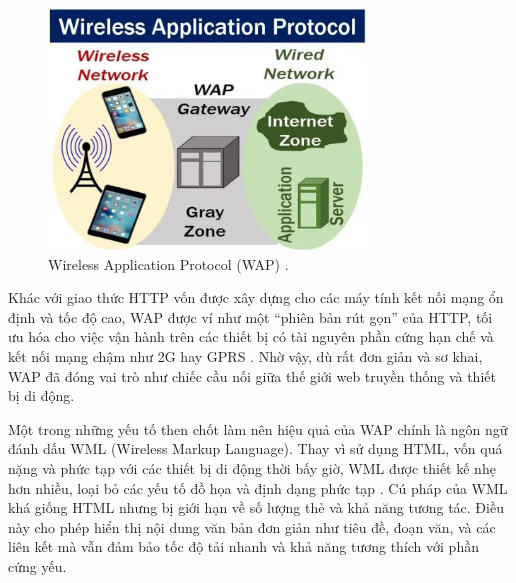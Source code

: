 \begin{figure}[H]
  \centering
  \includegraphics[width=0.75\textwidth]{images/Wireless-Application-Protocol-WAP-la-gi.jpg}
  \caption{Wireless Application Protocol (WAP) \cite{bkhostWAP}.}
  \label{fig:fig7}
\end{figure}
  
  \begin{flushleft}
  \hspace*{0.8cm}Khác với giao thức HTTP vốn được xây dựng cho các máy tính kết nối mạng ổn định và tốc độ cao, WAP được ví như một “phiên bản rút gọn” của HTTP, tối ưu hóa cho việc vận hành trên các thiết bị có tài nguyên phần cứng hạn chế và kết nối mạng chậm như 2G hay GPRS \cite{wap-vs-http}. Nhờ vậy, dù rất đơn giản và sơ khai, WAP đã đóng vai trò như chiếc cầu nối giữa thế giới web truyền thống và thiết bị di động.
  \end{flushleft}
  
  \begin{flushleft}
  \hspace*{0.8cm}Một trong những yếu tố then chốt làm nên hiệu quả của WAP chính là ngôn ngữ đánh dấu WML (Wireless Markup Language). Thay vì sử dụng HTML, vốn quá nặng và phức tạp với các thiết bị di động thời bấy giờ, WML được thiết kế nhẹ hơn nhiều, loại bỏ các yếu tố đồ họa và định dạng phức tạp \cite{wml-design}. Cú pháp của WML khá giống HTML nhưng bị giới hạn về số lượng thẻ và khả năng tương tác. Điều này cho phép hiển thị nội dung văn bản đơn giản như tiêu đề, đoạn văn, và các liên kết mà vẫn đảm bảo tốc độ tải nhanh và khả năng tương thích với phần cứng yếu.
  \end{flushleft}

